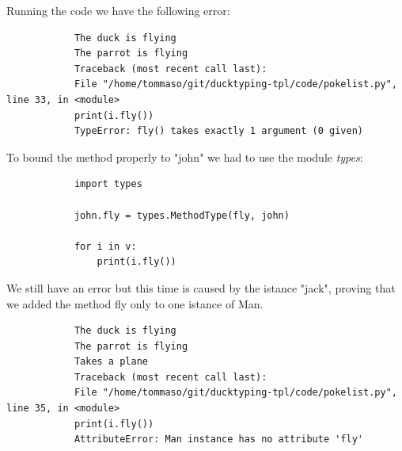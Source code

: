\documentclass[12pt]{article}
\begin{document}
		Running the code we have the following error:
		
		\begin{lstlisting}
			The duck is flying
			The parrot is flying
			Traceback (most recent call last):
			File "/home/tommaso/git/ducktyping-tpl/code/pokelist.py", line 33, in <module>
			print(i.fly())
			TypeError: fly() takes exactly 1 argument (0 given)
		\end{lstlisting}
		
		To bound the method properly to "john" we had to use the module \textit{types}:
		
		\begin{lstlisting}
			import types
			
			john.fly = types.MethodType(fly, john)
			
			for i in v:
				print(i.fly())
		\end{lstlisting}
		
		We still have an error but this time is caused by the istance "jack", proving that we added the method fly only to one istance of Man. 
		
		\begin{lstlisting}
			The duck is flying
			The parrot is flying
			Takes a plane
			Traceback (most recent call last):
			File "/home/tommaso/git/ducktyping-tpl/code/pokelist.py", line 35, in <module>
			print(i.fly())
			AttributeError: Man instance has no attribute 'fly'
		\end{lstlisting}
		
		
		
		
	
		
		






		
\end{document}
